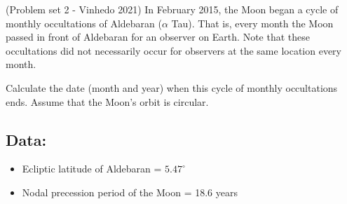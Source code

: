 \documentclass[11pt]{article}
\begin{document}
\begin{pproblem} (Problem set 2 - Vinhedo 2021)
    In February 2015, the Moon began a cycle of monthly occultations of Aldebaran ($\alpha$ Tau). That is, every month the Moon passed in front of Aldebaran for an observer on Earth. Note that these occultations did not necessarily occur for observers at the same location every month. 

    Calculate the date (month and year) when this cycle of monthly occultations ends. Assume that the Moon's orbit is circular.

    \subsection*{Data:}

    \begin{itemize}
        \item Ecliptic latitude of Aldebaran = $5.47^\circ$
        \item Nodal precession period of the Moon = 18.6 years
    \end{itemize}
\end{pproblem}
\end{document}
